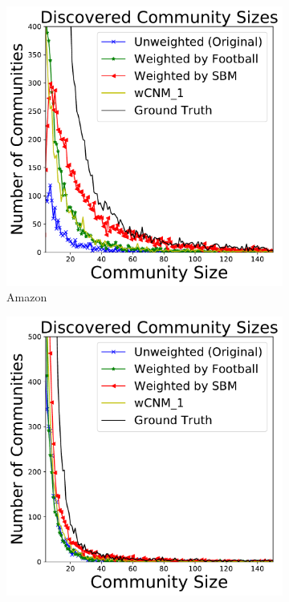 \begin{figure}[ht!]
\centering
\begin{subfigure}{.45\textwidth}
\centering
\includegraphics[width=.9\linewidth]{img/chap2/comm_distribution_amazon.pdf}
\caption{Amazon}
\label{fig:1}
\end{subfigure} %
\hfill %
\begin{subfigure}{.45\textwidth}
\centering
\includegraphics[width=.9\linewidth]{img/chap2/comm_distribution_dblp.pdf}

\end{subfigure}
\end{figure}
